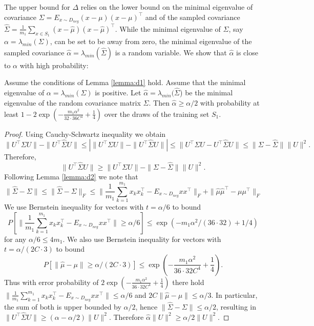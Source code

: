 \documentclass[twoside,11pt]{article}
\begin{document}
The upper bound for $\Delta$ relies on the lower bound on the minimal eigenvalue of covariance $\Sigma = E_{x \sim D_{neg}} (x- \mu) (x - \mu)^\top$ and of the sampled covariance $\hat \Sigma = \frac{1}{m_1} \sum_{x \in S_1} (x-\hat \mu) (x - \hat \mu)^\top$. While the minimal eigenvalue of $\Sigma$, say $\alpha = \lambda_{min}(\Sigma)$, can be set to be away from zero, the minimal eigenvalue of the sampled covariance $\hat \alpha = \lambda_{min}(\hat \Sigma)$ is a random variable. We show that $\hat \alpha$ is close to $\alpha$ with high probability:
\begin{lemma}
\label{lemma:d3}
Assume the conditions of Lemma \ref{lemma:d1} hold. Assume that the minimal eigenvalue of $\alpha = \lambda_{min}(\Sigma)$ is positive. Let $\hat \alpha = \lambda_{min} (\hat \Sigma$) be the minimal eigenvalue of the random covariance matrix $\hat \Sigma$. Then $\hat \alpha \ge \alpha/2$ with probability at least $1-2 \exp(-\frac{m_1\alpha^2}{32 \cdot 36 C^4} + \frac{1}{4})$ over the draws of the training set $S_1$.
\end{lemma}
\begin{proof}
Using Cauchy-Schwartz inequality we obtain
$$\|U^\top\Sigma U\|-\|U^\top\hat{\Sigma} U\|\leq \left | \|U^\top\Sigma U\|-\|U^\top\hat{\Sigma} U\|\right | \leq\|U^\top\Sigma U - U^\top\hat{\Sigma}U\| \le \|\Sigma - \hat \Sigma\|\|U\|^2.$$
Therefore,
$$\|U^\top\hat{\Sigma}U\| \geq \|U^\top\Sigma U\| -\|\Sigma-\hat{\Sigma}\|\|U\|^2.$$
Following Lemma \ref{lemma:d2} we note that
 \[
 \|\hat \Sigma - \Sigma\| \leq\|\hat \Sigma - \Sigma\|_F \le \| \frac{1}{m_1} \sum_{k=1}^{m_1}  x_k x_k^\top - E_{x \sim D_{neg}} x x^\top \|_F + \| \hat \mu \hat \mu^\top - \mu \mu^\top \|_F \nonumber
 \]
We use Bernstein inequality for vectors with $t=\alpha/6$ to bound $$P[\| \frac{1}{m_1} \sum_{k=1}^{m_1}  x_k x_k^\top - E_{x \sim D_{neg}} x x^\top \| \ge \alpha/6] \le \exp(-m_1 \alpha^2/(36 \cdot 32) + 1/4)$$ for any $\alpha/6 \le 4 m_1$. We also use Bernstein inequality for vectors with $t=\alpha/ (2C \cdot 3)$ to bound
 \[
 P[\|\hat \mu -\mu\| \ge \alpha/(2C \cdot 3)] \le \exp \left(- \frac{m_1 \alpha^2}{36 \cdot 32 C^4} + \frac{1}{4} \right).
 \]
Thus with error probability of $2\exp \left(- \frac{m_1 \alpha^2}{36 \cdot 32 C^4} + \frac{1}{4} \right)$ there hold $\| \frac{1}{m_1} \sum_{k=1}^{m_1}  x_k x_k^\top - E_{x \sim D_{neg}} x x^\top \| \le \alpha/6$ and $2C\|\hat \mu -\mu\| \le \alpha/3$. In particular, the sum of both is upper bounded by $\alpha/2$, hence $\|\hat \Sigma - \Sigma\| \le \alpha/2$, resulting in $\|U^\top\hat{\Sigma} U\|\geq (\alpha-\alpha/2)\|U\|^2$. Therefore $\hat{\alpha}\|U\|^2\geq \alpha/2\|U\|^2$.
\end{proof}
\end{document}
